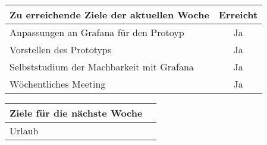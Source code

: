 \begin{tabularx}{\textwidth}{Xc}
    \arrayrulecolor{OliveGreen}
    \toprule
    {\bfseries Zu erreichende Ziele der aktuellen Woche} & {\bfseries Erreicht} \\
    \midrule[2pt]
    Anpassungen an Grafana für den Protoyp               &Ja                 \\
    \rowcolor{OliveGreen!15}
    Vorstellen des Prototyps                             &Ja                 \\
    \rowcolor{OliveGreen!15}
    Selbststudium der Machbarkeit mit Grafana            &Ja                 \\
    \rowcolor{OliveGreen!15}
    Wöchentliches Meeting                                &Ja                 \\
   \bottomrule[2pt]
\end{tabularx}
%
\vspace{1cm}
%
\begin{tabularx}{\textwidth}{Xc}
    \arrayrulecolor{OliveGreen}
    \toprule
    {\bfseries Ziele für die nächste Woche}              &                   \\
    \midrule[2pt]
    Urlaub                                               &                   \\
\end{tabularx}
